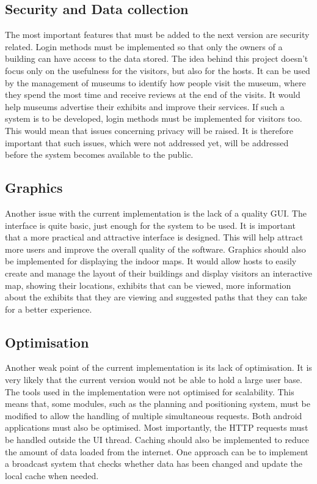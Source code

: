 \subsection{Security and Data collection}
The most important features that must be added to the next version are security related. Login methods must be implemented so that only the owners of a building can have access to the data stored. The idea behind this project doesn’t focus only on the usefulness for the visitors, but also for the hosts. It can be used by the management of museums to identify how people visit the museum, where they spend the most time and receive reviews at the end of the visits. It would help museums advertise their exhibits and improve their services. If such a system is to be developed, login methods must be implemented for visitors too. This would mean that issues concerning privacy will be raised. It is therefore important that such issues, which were not addressed yet, will be addressed before the system becomes available to the public. 

\subsection{Graphics}
Another issue with the current implementation is the lack of a quality GUI. The interface is quite basic, just enough for the system to be used. It is important that a more practical and attractive interface is designed. This will help attract more users and improve the overall quality of the software. Graphics should also be implemented for displaying the indoor maps. It would allow hosts to easily create and manage the layout of their buildings and display visitors an interactive map, showing their locations, exhibits that can be viewed, more information about the exhibits that they are viewing and suggested paths that they can take for a better experience. 

\subsection{Optimisation}
Another weak point of the current implementation is its lack of optimisation. It is very likely that the current version would not be able to hold a large user base. The tools used in the implementation were not optimised for scalability. This means that, some modules, such as the planning and positioning system, must be modified to allow the handling of multiple simultaneous requests. Both android applications must also be optimised. Most importantly, the HTTP requests must be handled outside the UI thread. Caching should also be implemented to reduce the amount of data loaded from the internet. One approach can be to implement a broadcast system that checks whether data has been changed and update the local cache when needed.

